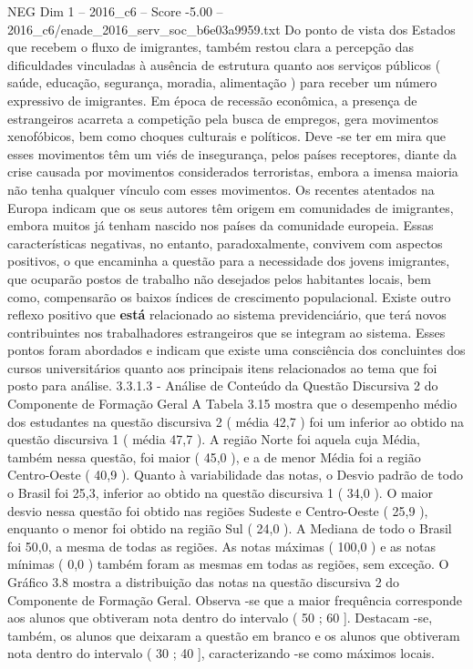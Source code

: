 \begin{textsample}{NEG Dim 1 – 2016\_c6 – Score -5.00 – 2016\_c6/enade\_2016\_serv\_soc\_b6e03a9959.txt}
Do ponto de vista dos Estados que recebem o fluxo de imigrantes, também restou clara a percepção das dificuldades vinculadas à ausência de estrutura quanto aos serviços públicos ( saúde, educação, segurança, moradia, alimentação ) para receber um número expressivo de imigrantes.
Em época de recessão econômica, a presença de estrangeiros acarreta a competição pela busca de empregos, gera movimentos xenofóbicos, bem como choques culturais e políticos.
Deve -se ter em mira que esses movimentos têm um viés de insegurança, pelos países receptores, diante da crise causada por movimentos considerados terroristas, embora a imensa maioria não tenha qualquer vínculo com esses movimentos.
Os recentes atentados na Europa indicam que os seus autores têm origem em comunidades de imigrantes, embora muitos já tenham nascido nos países da comunidade europeia.
Essas características negativas, no entanto, paradoxalmente, convivem com aspectos positivos, o que encaminha a questão para a necessidade dos jovens imigrantes, que ocuparão postos de trabalho não desejados pelos habitantes locais, bem como, compensarão os baixos índices de crescimento populacional.
Existe outro reflexo positivo que \textbf{está} relacionado ao sistema previdenciário, que terá novos contribuintes nos trabalhadores estrangeiros que se integram ao sistema.
Esses pontos foram abordados e indicam que existe uma consciência dos concluintes dos cursos universitários quanto aos principais itens relacionados ao tema que foi posto para análise. 3.3.1.3 - Análise de Conteúdo da Questão Discursiva 2 do Componente de Formação Geral A Tabela 3.15 mostra que o desempenho médio dos estudantes na questão discursiva 2 ( média 42,7 ) foi um inferior ao obtido na questão discursiva 1 ( média 47,7 ).
A região Norte foi aquela cuja Média, também nessa questão, foi maior ( 45,0 ), e a de menor Média foi a região Centro-Oeste ( 40,9 ).
Quanto à variabilidade das notas, o Desvio padrão de todo o Brasil foi 25,3, inferior ao obtido na questão discursiva 1 ( 34,0 ).
O maior desvio nessa questão foi obtido nas regiões Sudeste e Centro-Oeste ( 25,9 ), enquanto o menor foi obtido na região Sul ( 24,0 ).
A Mediana de todo o Brasil foi 50,0, a mesma de todas as regiões.
As notas máximas ( 100,0 ) e as notas mínimas ( 0,0 ) também foram as mesmas em todas as regiões, sem exceção.
O Gráfico 3.8 mostra a distribuição das notas na questão discursiva 2 do Componente de Formação Geral.
Observa -se que a maior frequência corresponde aos alunos que obtiveram nota dentro do intervalo ( 50 ; 60 ].
Destacam -se, também, os alunos que deixaram a questão em branco e os alunos que obtiveram nota dentro do intervalo ( 30 ; 40 ], caracterizando -se como máximos locais.

\end{textsample}
